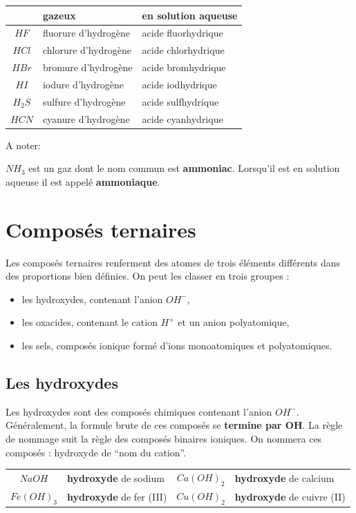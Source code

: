 \documentclass[
  11pt,
  french,
  a4paper,
  openany]{book}
\providecommand{\tightlist}{%
  \setlength{\itemsep}{0pt}\setlength{\parskip}{0pt}}
\begin{document}
\begin{longtable}[]{@{}cll@{}}
\toprule
& gazeux & en solution aqueuse\tabularnewline
\midrule
\endhead
\(HF\) & fluorure d'hydrogène & acide fluorhydrique\tabularnewline
\(HCl\) & chlorure d'hydrogène & acide chlorhydrique\tabularnewline
\(HBr\) & bromure d'hydrogène & acide bromhydrique\tabularnewline
\(HI\) & iodure d'hydrogène & acide iodhydrique\tabularnewline
\(H_2S\) & sulfure d'hydrogène & acide sulfhydrique\tabularnewline
\(HCN\) & cyanure d'hydrogène & acide cyanhydrique\tabularnewline
\bottomrule
\end{longtable}

A noter:

\(NH_3\) est un gaz dont le nom commun est \textbf{ammoniac}. Lorsqu'il est en solution aqueuse il est appelé \textbf{ammoniaque}.

\hypertarget{composuxe9s-ternaires}{%
\section{Composés ternaires}\label{composuxe9s-ternaires}}

Les composés ternaires renferment des atomes de trois éléments différents dans des proportions bien définies. On peut les classer en trois groupes :

\begin{itemize}
\tightlist
\item
  les hydroxydes, contenant l'anion \(OH^-\),
\item
  les oxacides, contenant le cation \(H^+\) et un anion polyatomique,
\item
  les sels, composés ionique formé d'ions monoatomiques et polyatomiques.
\end{itemize}

\hypertarget{les-hydroxydes}{%
\subsection{Les hydroxydes}\label{les-hydroxydes}}

Les hydroxydes sont des composés chimiques contenant l'anion \(OH^-\). Généralement, la formule brute de ces composés se \textbf{termine par OH}. La règle de nommage suit la règle des composés binaires ioniques. On nommera ces composés : hydroxyde de ``nom du cation''.

\begin{longtable}[]{@{}clcl@{}}
\toprule
\endhead
\(NaOH\) & \textbf{hydroxyde} de sodium & \(Ca(OH)_2\) & \textbf{hydroxyde} de calcium\tabularnewline
\(Fe(OH)_3\) & \textbf{hydroxyde} de fer (III) & \(Cu(OH)_2\) & \textbf{hydroxyde} de cuivre (II)\tabularnewline
\bottomrule
\end{longtable}
\end{document}
